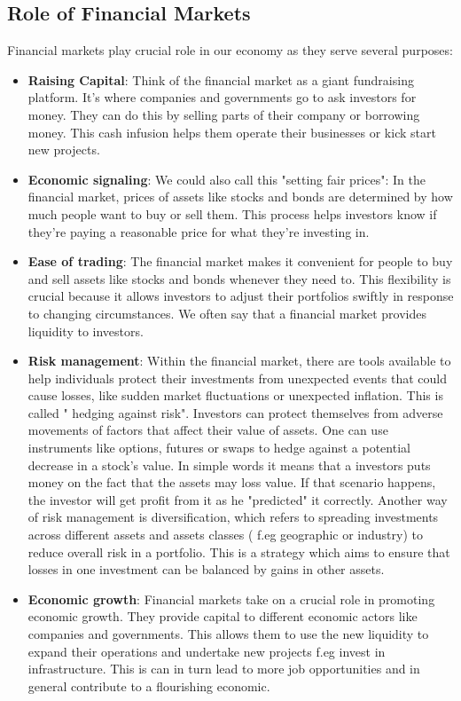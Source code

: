 \documentclass{article}
\begin{document}
\subsection{Role of Financial Markets} 
Financial markets play crucial role in our economy as they serve several purposes:
\begin{itemize}
    \item \textbf{Raising Capital}: Think of the financial market as a giant fundraising platform. It's where companies and governments go to ask investors for money. They can do this by selling parts of their company or borrowing money. This cash infusion helps them operate their businesses or kick start new projects.
    
    \item \textbf{Economic signaling}: We could also call this "setting fair prices": In the financial market, prices of assets like stocks and bonds are determined by how much people want to buy or sell them. This process helps investors know if they're paying a reasonable price for what they're investing in.
    \item \textbf{Ease of trading}: The financial market makes it convenient for people to buy and sell assets like stocks and bonds whenever they need to. This flexibility is crucial because it allows investors to adjust their portfolios swiftly in response to changing circumstances. We often say that a financial market provides liquidity to investors.
    \item \textbf{Risk management}: Within the financial market, there are tools available to help individuals protect their investments from unexpected events that could cause losses, like sudden market fluctuations or unexpected inflation. This is called " hedging against risk". Investors can protect themselves from adverse movements of factors that affect their value of assets. One can use
    instruments like options, futures or swaps to hedge against a potential decrease in a stock's value. In simple words it means that a investors puts money on the fact that the assets may loss value. If that scenario happens, the investor will get profit from it as he "predicted" it correctly. Another way of risk management is diversification, which refers to spreading investments across different assets and assets classes ( f.eg geographic or  industry) to reduce overall risk in a portfolio. This is a strategy which aims to ensure that losses in one investment can be balanced by gains in other assets.
     \item \textbf{Economic growth}: Financial markets take on a crucial role in promoting economic growth. They provide capital to different economic actors like companies and governments. This allows them to use the new liquidity to expand their operations and undertake new projects f.eg invest in infrastructure. This is can in turn lead to more job opportunities and in general contribute to a flourishing economic.
\end{itemize}
\end{document}
